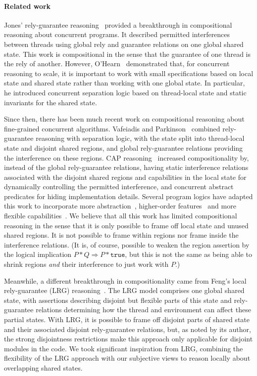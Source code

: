 \paragraph{Related work}
Jones' rely-guarantee reasoning~\cite{rg} provided a breakthrough in
compositional reasoning about concurrent programs. It described
permitted interferences between threads using global rely and
guarantee relations on one  global shared state. This work is
compositional in the sense that the guarantee of one thread is the
rely of another. However, O'Hearn~\cite{csl-tcs} demonstrated that,
for  concurrent reasoning to scale,
 it is important to work with small specifications
based on local  state and shared state rather than working with one
global state. In particular, he introduced concurrent
separation logic based on thread-local state and static invariants for
the shared state.


Since then, there has been much recent work on compositional
reasoning about fine-grained concurrent algorithms. Vafeiadis and
Parkinson~\cite{viktor-marriage} combined rely-guarantee reasoning with
separation logic, with the state split into thread-local state and
disjoint shared regions, and global rely-guarantee relations providing
the interference on these regions. 
CAP reasoning~\cite{cap-ecoop10} increased  compositionality by, instead of the
global
rely-guarantee relations, having static interference relations
associated with the disjoint shared regions and capabilities in the local
state for dynamically controlling the permitted  interference, and concurrent
abstract predicates for hiding implementation details. Several
program logics have adapted this work to incorporate more
abstraction~\cite{caresl}, higher-order features~\cite{icap} and more flexible
capabilities~\cite{tada}. We believe that all  this work has  limited compositional
reasoning in the sense that it is only possible to frame off local
state and unused shared regions. It is not possible to 
frame within regions nor frame inside the interference
relations.  (It is, of course, possible to weaken the region assertion
by the logical implication $P * Q \Rightarrow P * \texttt{true}$, but this is
not the same as being able to shrink regions \emph{and} their interference to
just work with $P$.) 

Meanwhile, a different breakthrough in compositionality came from
Feng's local rely-guarantee (LRG) reasoning~\cite{lrg}. The LRG model
comprises one global shared state, with assertions describing
{disjoint} but flexible parts of this state and rely-guarantee
relations determining how the thread and environment can affect these
partial states. With LRG, it is possible to frame off disjoint parts of
shared state and their associated disjoint rely-guarantee relations, but, as noted
by its author, the strong disjointness restrictions make this approach
only applicable for disjoint modules in the code. We took significant
inspiration from LRG, combining the flexibility of the LRG approach
with our subjective views to reason locally about overlapping shared
states.

